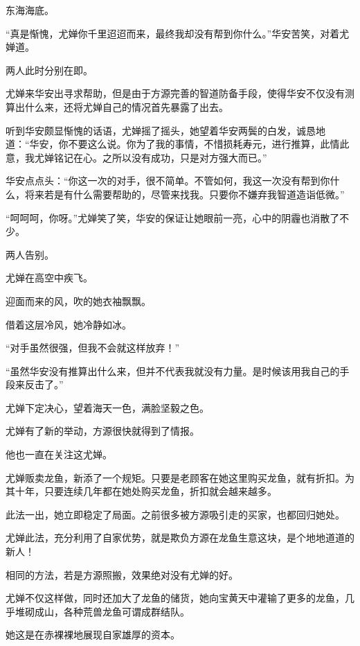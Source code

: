 
\begin{this_body}

东海海底。

“真是惭愧，尤婵你千里迢迢而来，最终我却没有帮到你什么。”华安苦笑，对着尤婵道。

两人此时分别在即。

尤婵来华安出寻求帮助，但是由于方源完善的智道防备手段，使得华安不仅没有测算出什么来，还将尤婵自己的情况首先暴露了出去。

听到华安颇显惭愧的话语，尤婵摇了摇头，她望着华安两鬓的白发，诚恳地道：“华安，你不要这么说。你为了我的事情，不惜损耗寿元，进行推算，此情此意，我尤婵铭记在心。之所以没有成功，只是对方强大而已。”

华安点点头：“你这一次的对手，很不简单。不管如何，我这一次没有帮到你什么，将来若是有什么需要帮助的，尽管来找我。只要你不嫌弃我智道造诣低微。”

“呵呵呵，你呀。”尤婵笑了笑，华安的保证让她眼前一亮，心中的阴霾也消散了不少。

两人告别。

尤婵在高空中疾飞。

迎面而来的风，吹的她衣袖飘飘。

借着这层冷风，她冷静如冰。

“对手虽然很强，但我不会就这样放弃！”

“虽然华安没有推算出什么来，但并不代表我就没有力量。是时候该用我自己的手段来反击了。”

尤婵下定决心，望着海天一色，满脸坚毅之色。

尤婵有了新的举动，方源很快就得到了情报。

他也一直在关注这尤婵。

尤婵贩卖龙鱼，新添了一个规矩。只要是老顾客在她这里购买龙鱼，就有折扣。为其十年，只要连续几年都在她处购买龙鱼，折扣就会越来越多。

此法一出，她立即稳定了局面。之前很多被方源吸引走的买家，也都回归她处。

尤婵此法，充分利用了自家优势，就是欺负方源在龙鱼生意这块，是个地地道道的新人！

相同的方法，若是方源照搬，效果绝对没有尤婵的好。

尤婵不仅这样做，同时还加大了龙鱼的储货，她向宝黄天中灌输了更多的龙鱼，几乎堆砌成山，各种荒兽龙鱼可谓成群结队。

她这是在赤裸裸地展现自家雄厚的资本。


\end{this_body}
